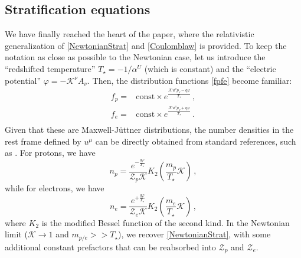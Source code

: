 \documentclass[a4paper, amsfonts, amssymb, amsmath, reprint, showkeys, nofootinbib, twoside, onecolumn,notitlepage]{revtex4-1}
\newcommand{\K}{{\mathcal{K}}}
\theoremstyle{definition}
\theoremstyle{theorem}
\begin{document}
\subsection{Stratification equations}

We have finally reached the heart of the paper, where the relativistic generalization of \eqref{NewtonianStrat} and \eqref{Coulomblaw} is provided. To keep the notation as close as possible to the Newtonian case, let us introduce the ``redshifted temperature''
$T_\star=-1/\alpha^U$ (which is constant) and the ``electric potential'' $\varphi=-\K^\nu A_\nu$. Then, the distribution functions \eqref{fpfe} become familiar:
\begin{equation}
\begin{split}
f_p ={}& \text{const}\times e^{\frac{\K u^\nu p_\nu-q\varphi}{T_\star}} \, , \\
f_e ={}& \text{const}\times e^{\frac{\K u^\nu p_\nu +q\varphi}{T_\star}} \, . \\
\end{split}    
\end{equation}
Given that these are Maxwell-J\"{u}ttner distributions, the number densities in the rest frame defined by $u^\mu$ can be directly obtained from standard references, such as \cite[Ch.2, \S 4.b, Eq.(33)]{Groot1980RelativisticKT}. For protons, we have
\begin{equation}\label{npfinale}
\boxed{n_p =\dfrac{e^{  {-}\frac{q\varphi}{T_\star}}}{\mathcal{Z}_p \K}  K_2 \left( \dfrac{m_p}{T_\star} \K \right) \, , }
\end{equation}
while for electrons, we have
\begin{equation}\label{nefinale}
\boxed{n_e =\dfrac{e^{+\frac{q\varphi}{T_\star}}}{\mathcal{Z}_e \K}  K_2 \left(\dfrac{m_e}{T_\star} \K \right) \, ,}
\end{equation}
where $K_2$ is the modified Bessel function of the second kind. In the Newtonian limit ($\K \rightarrow 1$ and $m_{p/e}>>T_\star$), we recover \eqref{NewtonianStrat}, with some additional constant prefactors that can be reabsorbed into $\mathcal{Z}_p$ and $\mathcal{Z}_e$.
\end{document}
